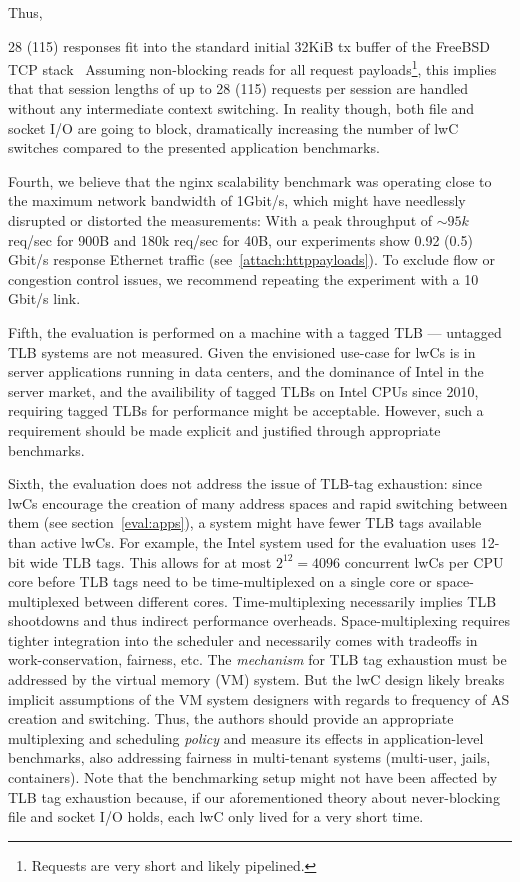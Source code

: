 \documentclass[10pt,twocolumn,letter]{article}
\begin{document}
Thus, {28 (115) responses fit into the standard initial 32KiB tx buffer of the FreeBSD TCP stack~\cite{fbsd11tcpsendspace}
Assuming non-blocking reads for all request payloads\footnote{Requests are very short and likely pipelined.}, this implies that that session lengths of up to 28 (115) requests per session are handled without any intermediate context switching.
In reality though, both file and socket I/O are going to block, dramatically increasing the number of lwC switches compared to the presented application benchmarks.

Fourth, we believe that the nginx scalability benchmark was operating close to the maximum network bandwidth of 1Gbit/s, which might have needlessly disrupted or distorted the measurements:
With a peak throughput of $\sim95k$ req/sec for 900B and 180k req/sec for 40B, our experiments show 0.92 (0.5) Gbit/s response Ethernet traffic (see~\ref{attach:httppayloads}).
To exclude flow or congestion control issues, we recommend repeating the experiment with a 10 Gbit/s link.

Fifth, the evaluation is performed on a machine with a tagged TLB --- untagged TLB systems are not measured.
Given the envisioned use-case for lwCs is in server applications running in data centers, and the dominance of Intel in the server market, and the availibility of tagged TLBs on Intel CPUs since 2010,
requiring tagged TLBs for performance might be acceptable.
However, such a requirement should be made explicit and justified through appropriate benchmarks.

Sixth, the evaluation does not address the issue of TLB-tag exhaustion:
since lwCs encourage the creation of many address spaces and rapid switching between them (see section~\ref{eval:apps}), a system might have fewer TLB tags available than active lwCs.
For example, the Intel system used for the evaluation uses 12-bit wide TLB tags.
This allows for at most $2^{12}=4096$ concurrent lwCs per CPU core before TLB tags need to be time-multiplexed on a single core or space-multiplexed between different cores.
Time-multiplexing necessarily implies TLB shootdowns and thus indirect performance overheads.
Space-multiplexing requires tighter integration into the scheduler and necessarily comes with tradeoffs in work-conservation, fairness, etc.
The \textit{mechanism} for TLB tag exhaustion must be addressed by the virtual memory (VM) system.
But the lwC design likely breaks implicit assumptions of the VM system designers with regards to frequency of AS creation and switching.
Thus, the authors should provide an appropriate multiplexing and scheduling \textit{policy} and measure its effects in application-level benchmarks, also addressing fairness in multi-tenant systems (multi-user, jails, containers).
Note that the benchmarking setup might not have been affected by TLB tag exhaustion because, if our aforementioned theory about never-blocking file and socket I/O holds, each lwC only lived for a very short time.

}
\end{document}
